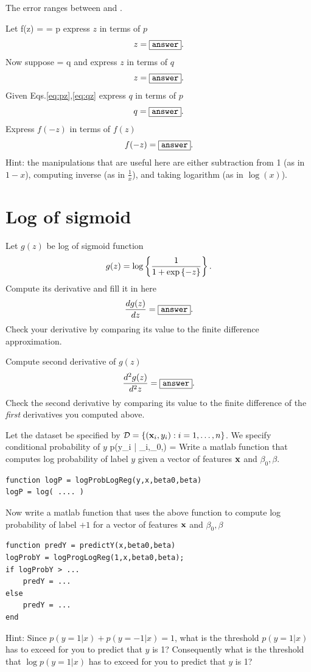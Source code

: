 \documentclass{article}
\begin{document}
\begin{remark} The error ranges between \answer and \answer.
\end{remark}


\newproblem{0.5pt}
Let
\BEQ\label{eq:pz}
f(z) =  = p
\EEQ
express $z$ in terms of $p$
\[
z = \fbox{\tt answer}.
\]
Now suppose
\BEQ\label{eq:qz}
 = q
\EEQ
and express $z$ in terms of $q$
\[
z = \fbox{\tt answer}.
\]
Given Eqs.\eqref{eq:pz},\eqref{eq:qz} express $q$ in terms of $p$
\[
q = \fbox{\tt answer}.
\]
Express $f(-z)$ in terms of $f(z)$
\[
f(-z) = \fbox{\tt answer}.
\]
Hint: the manipulations that are useful here are either subtraction from 1 (as in $1-x$), computing inverse (as in $\frac{1}{x}$), and taking logarithm (as in $\log(x)$).

\section*{Log of sigmoid}
\newproblem{0.5pt}
Let $g(z)$ be log of sigmoid function
\[
g(z) = \mathop{\rm log}\left\{ \frac{1}{1+ \mathop{\rm exp}\left\{-z\right\}} \right\}.
\]
Compute its derivative and fill it in here
\[
\frac{dg(z)}{dz} =  \answer.%
\]
Check your derivative by comparing its value to the finite difference approximation.


\newproblem{0.5pt}
Compute second derivative of $g(z)$
\[
\frac{d^2g(z)}{d^2z} =  \answer.%
\]
Check the second derivative by comparing its value to the finite difference of the {\em first} derivatives you computed above.


\newproblem{0.5pt}
Let the dataset be specified by $\mathcal{D} = \left\{ (\mathbf{x}_i,y_i):i=1,\dots,n \right\}$. We specify conditional probability of $y$
\BEQ \label{eq:plr}
p(y_i | \xx_i,\beta_0,\beta) = 
\EEQ
Write a matlab function that computes log probability of label $y$ given a vector of features $\mathbf{x}$ and $\beta_0,\beta$.
\begin{verbatim}
function logP = logProbLogReg(y,x,beta0,beta)
logP = log( .... )
\end{verbatim}
Now write a matlab function that uses the above function to compute log probability of label $+1$ for a vector of features $\mathbf{x}$ and $\beta_0,\beta$
\begin{verbatim}
function predY = predictY(x,beta0,beta)
logProbY = logProgLogReg(1,x,beta0,beta);
if logProbY > ...
    predY = ...
else
    predY = ...
end
\end{verbatim}
Hint: Since $p(y=1|x) + p(y=-1|x) = 1$, what is the threshold $p(y=1|x)$ has to exceed for you to predict that $y$ is 1? Consequently what is the threshold
that $\log p(y=1|x)$  has to exceed for you to predict that $y$ is 1?
\end{document}
